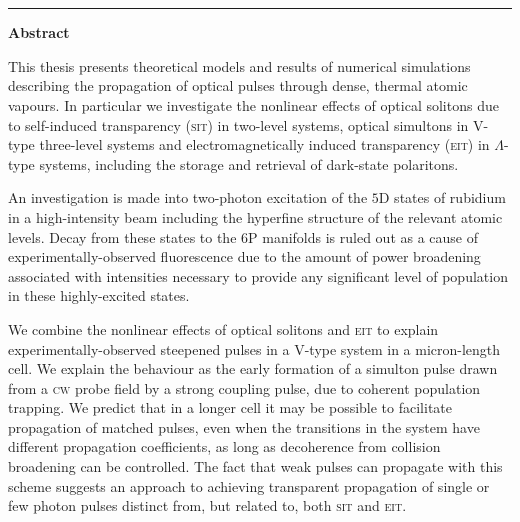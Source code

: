   \thispagestyle{empty}
  \vspace{-1cm}
  \begin{center}
  {\huge \textbf{\thesistitle}}
  \\
  \vspace{0.8cm} {\Large \textbf{\myname}\\\rule{7cm}{0.2mm}}
  \end{center}
  \vspace{0.6cm}
  {\large \textbf{Abstract}}

  \begin{small}
  This thesis presents theoretical models and results of numerical simulations
  describing the propagation of optical pulses through dense, thermal atomic
  vapours. In particular we investigate the nonlinear effects of optical
  solitons due to self-induced transparency (\textsc{sit}) in two-level systems,
  optical simultons in V-type three-level systems and electromagnetically
  induced transparency (\textsc{eit}) in $\Lambda$-type systems, including the
  storage and retrieval of dark-state polaritons.

  An investigation is made into two-photon excitation of the $5$D states of
  rubidium in a high-intensity beam including the hyperfine structure of the
  relevant atomic levels. Decay from these states to the $6$P manifolds is ruled
  out as a cause of experimentally-observed fluorescence due to the amount of
  power broadening associated with intensities necessary to provide any
  significant level of population in these highly-excited states.

  We combine the nonlinear effects of optical solitons and \textsc{eit} to
  explain experimentally-observed steepened pulses in a V-type system in a
  micron-length cell. We explain the behaviour as the early formation of a
  simulton pulse drawn from a \textsc{cw} probe field by a strong coupling
  pulse, due to coherent population trapping. We predict that in a longer cell
  it may be possible to facilitate propagation of matched pulses, even when the
  transitions in the system have different propagation coefficients, as long as
  decoherence from collision broadening can be controlled. The fact that weak
  pulses can propagate with this scheme suggests an approach to achieving
  transparent propagation of single or few photon pulses distinct from, but
  related to, both \textsc{sit} and \textsc{eit}.

  \end{small}

  \newpage